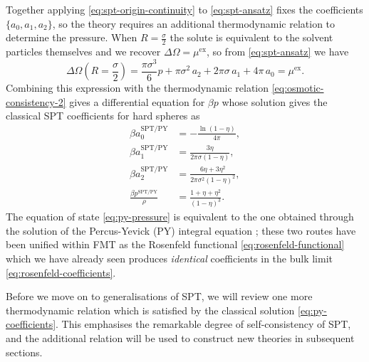 \documentclass[11pt,twoside]{report}
\begin{document}
Together applying \eqref{eq:spt-origin-continuity} to \eqref{eq:spt-ansatz} fixes the coefficients $\{a_0, a_1, a_2\}$, so the theory requires an additional thermodynamic relation to determine the pressure.
When $R = \frac{\sigma}{2}$ the solute is equivalent to the solvent particles themselves and we recover $\Delta\Omega = \mu^\mathrm{ex}$, so from \eqref{eq:spt-ansatz} we have
\begin{equation}\label{eq:spt-mu}
  \Delta\Omega\left(R=\frac{\sigma}{2}\right) =
  \frac{\pi \sigma^3}{6} p
  + \pi \sigma^2 \, a_2
  + 2 \pi \sigma \, a_1
  + 4\pi \, a_0
  =
  \mu^\mathrm{ex}.
\end{equation}
Combining this expression with the thermodynamic relation \eqref{eq:osmotic-consistency-2} gives a differential equation for $\beta p$ whose solution gives the classical SPT coefficients for hard spheres as \cite{ReissJCP1959,LebowitzJCP1965}
\begin{subequations}\label{eq:py-coefficients}
  \begin{align}
    \beta a_0^\mathrm{SPT/PY}
    &=
    -\frac{\ln{(1- \eta)}}{4\pi},
    \\
    \beta a_1^\mathrm{SPT/PY}
    &=
    \frac{3\eta}{2\pi \sigma (1 - \eta)},
    \\
    \beta a_2^\mathrm{SPT/PY}
    &=
    \frac{6\eta + 3\eta^2}{2\pi \sigma^2 (1 - \eta)^2},
    \\
    \frac{\beta p^\mathrm{SPT/PY}}{\rho}
    &=
    \frac{1 + \eta + \eta^2}{(1 - \eta)^3}.
    \label{eq:py-pressure}
 \end{align}
\end{subequations}
The equation of state \eqref{eq:py-pressure} is equivalent to the one obtained through the solution of the Percus-Yevick (PY) integral equation%
;
these two routes have been unified within FMT as the Rosenfeld functional \eqref{eq:rosenfeld-functional} \cite{RosenfeldPRL1989} which we have already seen produces \emph{identical} coefficients in the bulk limit \eqref{eq:rosenfeld-coefficients}.

Before we move on to generalisations of SPT, we will review one more thermodynamic relation which is satisfied by the classical solution \eqref{eq:py-coefficients}.
This emphasises the remarkable degree of self-consistency of SPT, and the additional relation will be used to construct new theories in subsequent sections.
\end{document}
